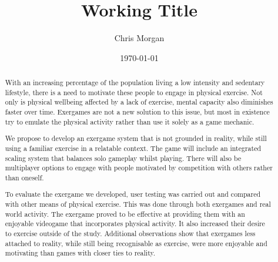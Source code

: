 \documentclass[a4paper, 11pt]{article}
\title{Working Title}
\author{Chris Morgan}
\date{\today}
\begin{document}
\maketitle

\begin{abstract}
With an increasing percentage of the population living a low intensity and sedentary lifestyle, there is a need to motivate these people to engage in physical exercise. Not only is physical wellbeing affected by a lack of exercise, mental capacity also diminishes faster over time. Exergames are not a new solution to this issue, but most in existence try to emulate the physical activity rather than use it solely as a game mechanic.

We propose to develop an exergame system that is not grounded in reality, while still using a familiar exercise in a relatable context. The game will include an integrated scaling system that balances solo gameplay whilst playing. There will also be multiplayer options to engage with people motivated by competition with others rather than oneself.

To evaluate the exergame we developed, user testing was carried out and compared with other means of physical exercise. This was done through both exergames and real world activity. The exergame proved to be effective at providing them with an enjoyable videogame that incorporates physical activity. It also increased their desire to exercise outside of the study. Additional observations show that exergames less attached to reality, while still being recognisable as exercise, were more enjoyable and motivating than games with closer ties to reality.
\end{abstract}

\clearpage
\end{document}
